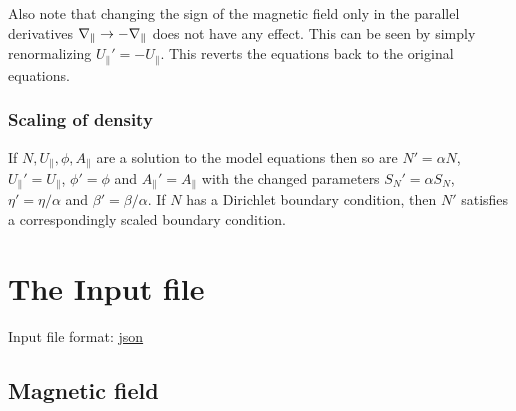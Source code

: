 Also note that changing the sign of the magnetic field only in the parallel derivatives $\nabla_\parallel \rightarrow -\nabla_\parallel$ does not
have any effect. This can be seen by simply renormalizing $U_\parallel'=-U_\parallel$. This reverts the equations back to the original equations.
\subsubsection{Scaling of density}
If $N, U_\parallel, \phi, A_\parallel$ are a solution to the model equations
then so are $N'=\alpha N$, $U_\parallel'=U_\parallel$, $\phi'=\phi$ and $A_\parallel'=A_\parallel$ with the changed parameters $S_N' = \alpha S_N$, $\eta' = \eta/\alpha$ and $ \beta' = \beta/\alpha$. If $N$
has a Dirichlet boundary condition, then $N'$ satisfies a correspondingly scaled boundary condition.

\section{The Input file} \label{sec:input_file}
Input file format: \href{https://en.wikipedia.org/wiki/JSON}{json}

\subsection{Magnetic field} \label{sec:geometry_file}

